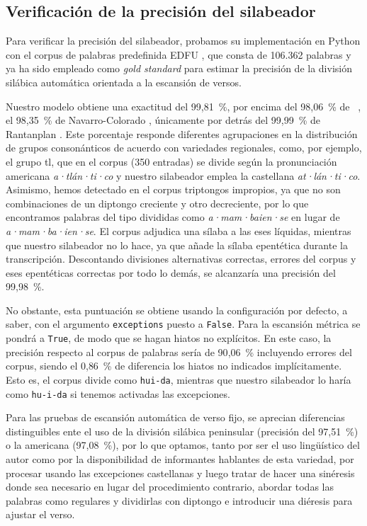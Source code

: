 \subsection{Verificación de la precisión del silabeador}\label{sec:silpres}
Para verificar la precisión del silabeador, probamos su implementación en Python con el corpus de palabras predefinida EDFU \parencite{rosa2020a}, que consta de 106{.}362 palabras y ya ha sido empleado como \textit{gold standard} para estimar la precisión de la división silábica automática orientada a la escansión de versos.

Nuestro modelo obtiene una exactitud del 99{,}81~\%, por encima del 98{,}06~\% de \citeauthor{agirrezabal2017}~\parencite*{agirrezabal2017}, el 98{,}35~\% de Navarro-Colorado \parencite*{navarrocolorado2015}, únicamente por detrás del 99{,}99~\% de Rantanplan \parencite{rosa2020b}. Este porcentaje responde diferentes agrupaciones en la distribución de grupos consonánticos de acuerdo con variedades regionales, como, por ejemplo, el grupo \textlangle{}tl\textrangle{}, que en el corpus (350 entradas) se divide según la pronunciación americana \textit{a·tlán·ti·co} y nuestro silabeador emplea la castellana \textit{at·lán·ti·co}. Asimismo, hemos detectado en el corpus triptongos impropios, ya que no son combinaciones de un diptongo creciente y otro decreciente, por lo que encontramos palabras del tipo  divididas como \textit{a·mam·baien·se} en lugar de \textit{a·mam·ba·ien·se}. El corpus adjudica una sílaba a las eses líquidas, mientras que nuestro silabeador no lo hace, ya que añade la sílaba epentética durante la transcripción. Descontando divisiones alternativas correctas, errores del corpus y eses epentéticas correctas por todo lo demás, se alcanzaría una precisión del 99{,}98~\%.

No obstante, esta puntuación se obtiene usando la configuración por defecto, a saber, con el argumento \texttt{exceptions} puesto a \texttt{False}. Para la escansión métrica se pondrá a \texttt{True}, de modo que se hagan hiatos no explícitos. En este caso, la precisión respecto al corpus de palabras sería de 90{,}06~\% incluyendo errores del corpus, siendo el 0{,}86~\% de diferencia los hiatos no indicados implícitamente. Esto es, el corpus divide   como \texttt{hui-da}, mientras que nuestro silabeador lo haría como \texttt{hu-i-da} si tenemos activadas las excepciones.

Para las pruebas de escansión automática de verso fijo, se aprecian diferencias distinguibles ente el uso de la división silábica peninsular  (precisión del 97{,}51~\%) o la americana (97{,}08~\%), por lo que optamos, tanto por ser el uso lingüístico del autor como por la disponibilidad de informantes hablantes de esta variedad, por procesar usando las excepciones castellanas y luego tratar de hacer una sinéresis donde sea necesario en lugar del procedimiento contrario, abordar todas las palabras como regulares y dividirlas con diptongo e introducir una diéresis para ajustar el verso.
